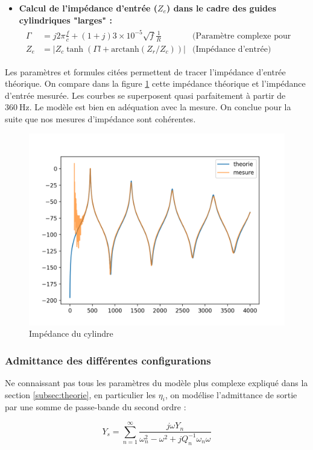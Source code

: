 \documentclass[atiam, article]{rapport} %
\begin{document}
\begin{itemize}
    \item \textbf{Calcul de l'impédance d'entrée (\(Z_e\)) dans le cadre des guides cylindriques "larges" :}
    \begin{align*}
        \begin{array}{lll}
            \Gamma & = j2\pi\frac{f}{c} + (1 + j)3 \times 10^{-5} \sqrt{f} \frac{1}{R} & \text{(Paramètre complexe pour les pertes viscothermiques)} \\
            Z_e & = \lvert Z_c \tanh(\Gamma l + \text{arctanh}(Z_r/Z_c)) \rvert & \text{(Impédance d'entrée)}
        \end{array}
        \label{eq:ze-cyl}
    \end{align*}
\end{itemize}

Les paramètres et formules citées permettent de tracer l'impédance d'entrée théorique. On compare dans la figure \ref{fig:ze-cyl} cette impédance théorique et l'impédance d'entrée mesurée. Les courbes se superposent quasi parfaitement à partir de $\SI{360}{\Hz}$. Le modèle est bien en adéquation avec la mesure. On conclue pour la suite que nos mesures d'impédance sont cohérentes.

\begin{figure}
    \centering
    \includegraphics[width=.5\textwidth]{vents/images_vents/impedance_cylindre.png}
    \caption{Impédance du cylindre}
    \label{fig:ze-cyl}
\end{figure}

\subsubsection{Admittance des différentes configurations}

Ne connaissant pas tous les paramètres du modèle plus complexe expliqué dans la section \ref{subsec:theorie}, en particulier les $\eta_i$, on modélise l'admittance de sortie par une somme de passe-bande du second ordre :

$$
Y_s=\sum_{n=1}^{\infty} \frac{j \omega Y_n}{\omega_n^2-\omega^2+j Q_n^{-1} \omega_n \omega}
$$
\end{document}
